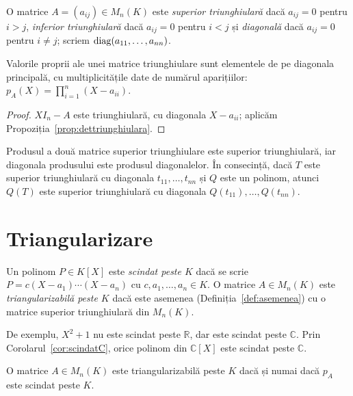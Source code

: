 O matrice $A=(a_{ij})\in M_n(K)$ este \emph{superior triunghiulară} dacă $a_{ij}=0$ pentru $i>j$, \emph{inferior triunghiulară} dacă $a_{ij}=0$ pentru $i<j$ și \emph{diagonală} dacă $a_{ij}=0$ pentru $i\neq j$; scriem $\operatorname{diag}(a_{11},\dots,a_{nn})$.

\begin{lema}\label{lema:valproptriunghiulara}
Valorile proprii ale unei matrice triunghiulare sunt elementele de pe diagonala principală, cu multiplicitățile date de numărul aparițiilor: $p_A(X)=\prod_{i=1}^n(X-a_{ii})$.
\end{lema}

\begin{proof}
$XI_n-A$ este triunghiulară, cu diagonala $X-a_{ii}$; aplicăm Propoziția~\ref{prop:dettriunghiulara}.
\end{proof}

Produsul a două matrice superior triunghiulare este superior triunghiulară, iar diagonala produsului este produsul diagonalelor. În consecință, dacă $T$ este superior triunghiulară cu diagonala $t_{11},\dots,t_{nn}$ și $Q$ este un polinom, atunci $Q(T)$ este superior triunghiulară cu diagonala $Q(t_{11}),\dots,Q(t_{nn})$.

\section{Triangularizare}

\begin{definitie}
Un polinom $P\in K[X]$ este \emph{scindat peste $K$} dacă se scrie $P=c(X-a_1)\cdots(X-a_n)$ cu $c,a_1,\dots,a_n\in K$. O matrice $A\in M_n(K)$ este \emph{triangularizabilă peste $K$} dacă este asemenea (Definiția~\ref{def:asemenea}) cu o matrice superior triunghiulară din $M_n(K)$.
\end{definitie}

De exemplu, $X^2+1$ nu este scindat peste $\mathbb{R}$, dar este scindat peste $\mathbb{C}$. Prin Corolarul~\ref{cor:scindatC}, orice polinom din $\mathbb{C}[X]$ este scindat peste $\mathbb{C}$.

\begin{teorema}\label{teo:triangularizare}
O matrice $A\in M_n(K)$ este triangularizabilă peste $K$ dacă și numai dacă $p_A$ este scindat peste $K$.
\end{teorema}

